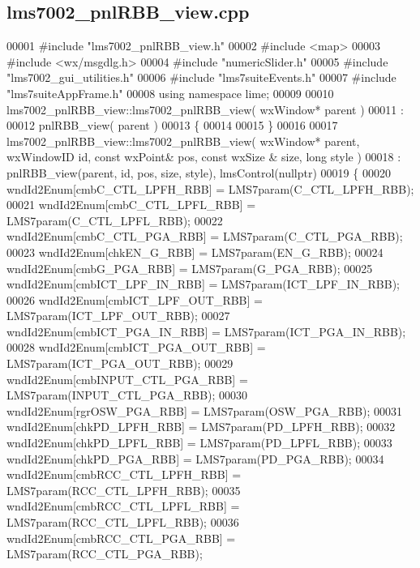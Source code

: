 \subsection{lms7002\+\_\+pnl\+R\+B\+B\+\_\+view.\+cpp}
\label{lms7002__pnlRBB__view_8cpp_source}

\begin{DoxyCode}
00001 \textcolor{preprocessor}{#include "lms7002_pnlRBB_view.h"}
00002 \textcolor{preprocessor}{#include <map>}
00003 \textcolor{preprocessor}{#include <wx/msgdlg.h>}
00004 \textcolor{preprocessor}{#include "numericSlider.h"}
00005 \textcolor{preprocessor}{#include "lms7002_gui_utilities.h"}
00006 \textcolor{preprocessor}{#include "lms7suiteEvents.h"}
00007 \textcolor{preprocessor}{#include "lms7suiteAppFrame.h"}
00008 \textcolor{keyword}{using namespace }lime;
00009 
00010 lms7002_pnlRBB_view::lms7002_pnlRBB_view( wxWindow* parent )
00011 :
00012 pnlRBB_view( parent )
00013 \{
00014 
00015 \}
00016 
00017 lms7002_pnlRBB_view::lms7002_pnlRBB_view( wxWindow* parent, wxWindowID \textcolor{keywordtype}{id}, \textcolor{keyword}{const} wxPoint& pos, \textcolor{keyword}{const} wxSize
      & size, \textcolor{keywordtype}{long} style )
00018     : pnlRBB_view(parent, id, pos, size, style), lmsControl(nullptr)
00019 \{
00020     wndId2Enum[cmbC_CTL_LPFH_RBB] = LMS7param(C_CTL_LPFH_RBB);
00021     wndId2Enum[cmbC_CTL_LPFL_RBB] = LMS7param(C_CTL_LPFL_RBB);
00022     wndId2Enum[cmbC_CTL_PGA_RBB] = LMS7param(C_CTL_PGA_RBB);
00023     wndId2Enum[chkEN_G_RBB] = LMS7param(EN_G_RBB);
00024     wndId2Enum[cmbG_PGA_RBB] = LMS7param(G_PGA_RBB);
00025     wndId2Enum[cmbICT_LPF_IN_RBB] = LMS7param(ICT_LPF_IN_RBB);
00026     wndId2Enum[cmbICT_LPF_OUT_RBB] = LMS7param(ICT_LPF_OUT_RBB);
00027     wndId2Enum[cmbICT_PGA_IN_RBB] = LMS7param(ICT_PGA_IN_RBB);
00028     wndId2Enum[cmbICT_PGA_OUT_RBB] = LMS7param(ICT_PGA_OUT_RBB);
00029     wndId2Enum[cmbINPUT_CTL_PGA_RBB] = LMS7param(INPUT_CTL_PGA_RBB);
00030     wndId2Enum[rgrOSW_PGA_RBB] = LMS7param(OSW_PGA_RBB);
00031     wndId2Enum[chkPD_LPFH_RBB] = LMS7param(PD_LPFH_RBB);
00032     wndId2Enum[chkPD_LPFL_RBB] = LMS7param(PD_LPFL_RBB);
00033     wndId2Enum[chkPD_PGA_RBB] = LMS7param(PD_PGA_RBB);
00034     wndId2Enum[cmbRCC_CTL_LPFH_RBB] = LMS7param(RCC_CTL_LPFH_RBB);
00035     wndId2Enum[cmbRCC_CTL_LPFL_RBB] = LMS7param(RCC_CTL_LPFL_RBB);
00036     wndId2Enum[cmbRCC_CTL_PGA_RBB] = LMS7param(RCC_CTL_PGA_RBB);

\end{DoxyCode}
